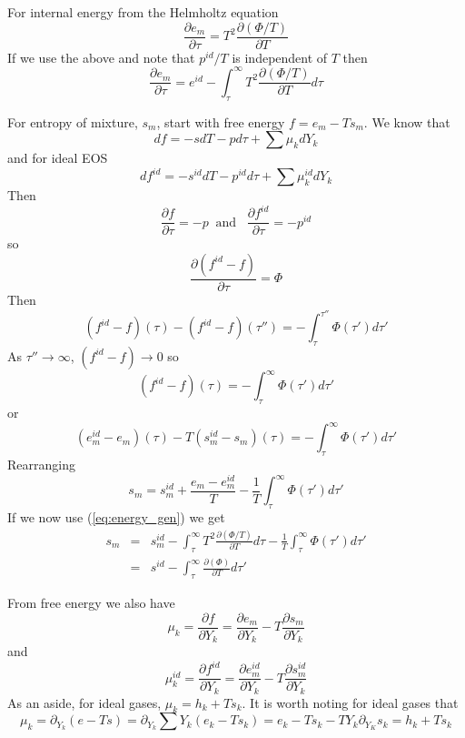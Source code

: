 \documentclass[11pt]{article}
\begin{document}
For internal energy from the Helmholtz equation
\begin{equation}
\frac{\partial e_m}{\partial \tau} = T^2 \frac{\partial (\Phi/T)} {\partial T}
\end{equation}
If we use the above and note that $p^{id}/T$ is independent of $T$ then
\begin{equation}
\frac{\partial e_m}{\partial \tau} = e^{id}- \int_\tau^\infty  T^2 \frac{\partial (\Phi/T)} {\partial T} d\tau
\label{eq:energy_gen}
\end{equation}

For entropy of mixture, $s_m$,
start with free energy $f = e_m - Ts_m$.
We know that
\[
df = -s dT - p d\tau + \sum \mu_k dY_k
\]
and for ideal EOS
\[
df^{id} = -s^{id} dT - p^{id} d\tau + \sum \mu_k^{id} dY_k
\]
Then
\begin{equation}
\frac{\partial f}{\partial \tau} = -p \;\; \mathrm{and} \;\;\;
\frac{\partial f^{id}}{\partial \tau} = -p^{id}
\end{equation}
so
\[
\frac{\partial (f^{id} - f)}{\partial \tau} = \Phi
\]
Then
\begin{equation}
(f^{id} - f)(\tau) - 
(f^{id} - f)(\tau '' ) = -\int_\tau^{\tau ''} \Phi (\tau ')d\tau ' 
\end{equation}
As $\tau'' \rightarrow \infty$, $( f^{id}-f) \rightarrow 0$
so
\begin{equation}
(f^{id} - f)(\tau) 
 = -\int_\tau^{\infty} \Phi (\tau ')d\tau ' 
\end{equation}
or
\begin{equation}
(e_m^{id} - e_m)(\tau) - 
T(s_m^{id} - s_m)(\tau) 
 = -\int_\tau^{\infty} \Phi (\tau ')d\tau ' 
\end{equation}
Rearranging
\begin{equation}
s_m = s_m^{id} + \frac{e_m-e_m^{id}}{T} - \frac{1}{T}
\int_\tau^{\infty} \Phi (\tau ')d\tau ' 
\end{equation}
If we now use (\ref{eq:energy_gen})
we get
\begin{eqnarray}
s_m &=& s_m^{id} -
\int_\tau^\infty  T^2 \frac{\partial (\Phi/T)} {\partial T} d\tau
- \frac{1}{T}
\int_\tau^{\infty} \Phi (\tau ')d\tau '  \\
&=& s^{id}
-\int_\tau^{\infty} \frac{\partial (\Phi)} {\partial T} d\tau ' 
\end{eqnarray}

From free energy we also have
\[
\mu_k = \frac{\partial f}{\partial Y_k} = 
 \frac{\partial e_m}{\partial Y_k} - 
 T\frac{\partial s_m}{\partial Y_k} 
\]
and
\[
\mu_k^{id} = \frac{\partial f^{id}}{\partial Y_k} = 
 \frac{\partial e_m^{id}}{\partial Y_k} - 
 T\frac{\partial s_m^{id}}{\partial Y_k} 
\]
As an aside, for ideal gases, $\mu_k = h_k + T s_k$.  It is worth noting for ideal gases 
that
\[
\mu_k = \partial_{Y_k} (e - T s) = 
 \partial_{Y_k} \sum Y_k(e_k - T s_k) = e_k - T s_k - T Y_k \partial_{Y_K}s_k = h_k + T s_k
\]
\end{document}

